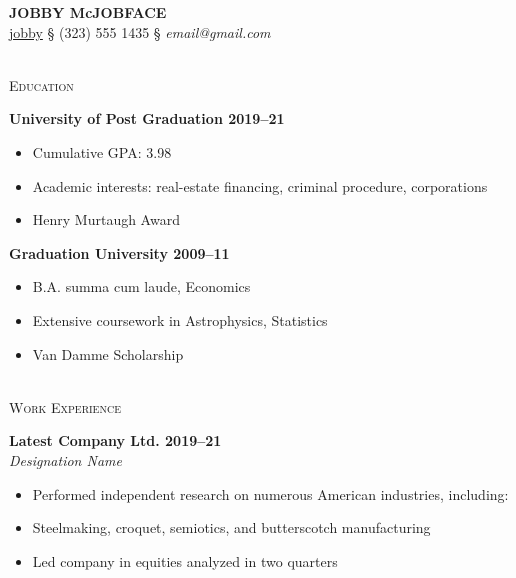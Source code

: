\documentclass[11pt]{article}
\newcommand{\linehead}[1]	%
	{\vspace{5mm} 
	{\color{cvColour}
	\hrulefill \\ 
	{\large 
	\textsc{{#1}}}}}
\newcommand{\bighead}[1]
	{\vspace{5mm} 
	{\large 
	{\textbf {#1}}}}
\newcommand{\ithead}[1]
	{{\large 
	{\textit {#1}}}}
\begin{document}
\begin{center}
    {\huge \color{cvColour} \textbf{JOBBY McJOBFACE}} \\
    \vspace{3mm}
    \faLinkedinIn \href{https://www.linkedin.com/company/linkedin}{jobby}
    {\color{Gray} \S}
    \faMobile*(323) 555 1435  
    {\color{Gray} \S}
    \faEnvelope[regular] \textit{email@gmail.com}
\end{center} 

\vspace{-5mm}


\linehead{Education}

\bighead{University of Post Graduation \hfill 2019–21}
\begin{itemize}
    \item Cumulative GPA: 3.98
    \item Academic interests: real-estate financing, criminal procedure, corporations
    \item Henry Murtaugh Award
\end{itemize}

\bighead{Graduation University \hfill 2009–11}
\begin{itemize}
    \item B.A. summa cum laude, Economics
    \item Extensive coursework in Astrophysics, Statistics
    \item Van Damme Scholarship
\end{itemize}



\linehead{Work Experience}

\bighead{Latest Company Ltd. \hfill 2019–21} \\
\ithead{Designation Name}
\begin{itemize}
    \item Performed independent research on numerous American industries, including:
    \item Steelmaking, croquet, semiotics, and butterscotch manufacturing
    \item Led company in equities analyzed in two quarters
\end{itemize}
\end{document}
